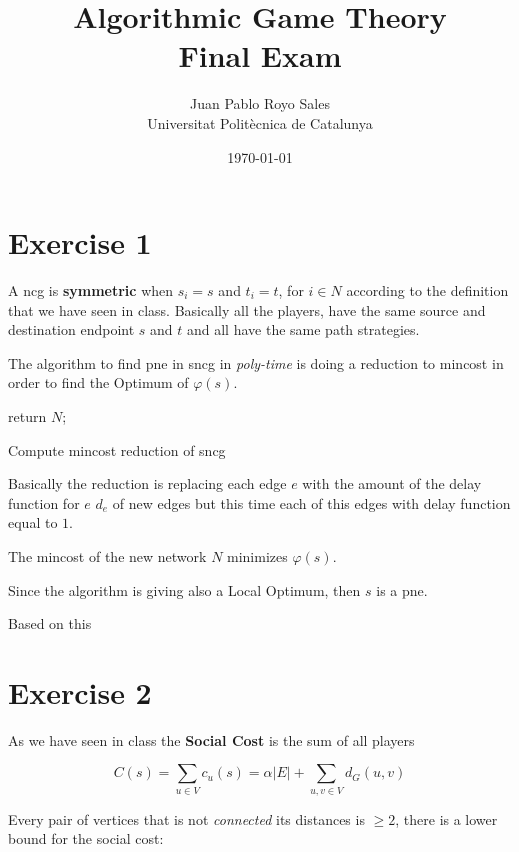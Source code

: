 \documentclass[12pt, a4paper]{article}
\title{%
  Algorithmic Game Theory \\
  Final Exam
}
\author{%
  Juan Pablo Royo Sales\\
  \small{Universitat Politècnica de Catalunya}
}
\date\today
\begin{document}
\maketitle

\section{Exercise 1}
A \acrfull{ncg} is \textbf{symmetric} when $s_i = s$ and $t_i = t$, for $i \in N$ according to the definition that we have seen in class. Basically all the players, have the 
same source and destination endpoint $s$ and $t$ and all have the same path strategies.

The algorithm to find \acrfull{pne} in \acrshort{sncg} in \textit{poly-time} is doing a reduction to \acrfull{mincost}
in order to find the Optimum of $\varphi(s)$.

\begin{algorithm}[H]
  return $N$;
  \caption{Compute \acrshort{mincost} reduction of \acrshort{sncg}}
\end{algorithm}

Basically the reduction is replacing each edge $e$ with the amount of the delay function for $e$ $d_e$ of new edges
but this time each of this edges with delay function equal to $1$.

The \acrshort{mincost} of the new network $N$ minimizes $\varphi(s)$.

Since the algorithm is giving also a Local Optimum, then $s$ is a \acrshort{pne}.

Based on this~\cite{ne_complex}
\section{Exercise 2}
As we have seen in class the \textbf{Social Cost} is the sum of all players 

\begin{equation}
  C(s) = \sum_{u \in V} c_u(s) = \alpha|E| + \sum_{u,v \in V} d_G(u,v)
\end{equation}

Every pair of vertices that is not \textit{connected} its distances is $\ge 2$, there is a lower bound for the 
social cost:
\end{document}
